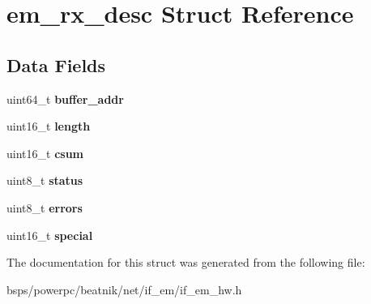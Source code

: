 \hypertarget{structem__rx__desc}{}\section{em\+\_\+rx\+\_\+desc Struct Reference}
\label{structem__rx__desc}
\subsection*{Data Fields}
\begin{DoxyCompactItemize}
\item 
\mbox{\label{structem__rx__desc_ab811d9d7d74ac96467b640fcba0467b7}} 
uint64\+\_\+t {\bfseries buffer\+\_\+addr}
\item 
\mbox{\label{structem__rx__desc_a92b587666841fcba18041c56ee83e58e}} 
uint16\+\_\+t {\bfseries length}
\item 
\mbox{\label{structem__rx__desc_aa789f9fe1bcc62ba14110bfb9e737b9b}} 
uint16\+\_\+t {\bfseries csum}
\item 
\mbox{\label{structem__rx__desc_a4cc2d79bca1fb0999d78df0ae7336bd5}} 
uint8\+\_\+t {\bfseries status}
\item 
\mbox{\label{structem__rx__desc_ac3d5a827ca4cdd2d0100a5da4eb41693}} 
uint8\+\_\+t {\bfseries errors}
\item 
\mbox{\label{structem__rx__desc_a654e2e1c650f35c736825598ffd786e4}} 
uint16\+\_\+t {\bfseries special}
\end{DoxyCompactItemize}


The documentation for this struct was generated from the following file\+:\begin{DoxyCompactItemize}
\item 
bsps/powerpc/beatnik/net/if\+\_\+em/if\+\_\+em\+\_\+hw.\+h\end{DoxyCompactItemize}
